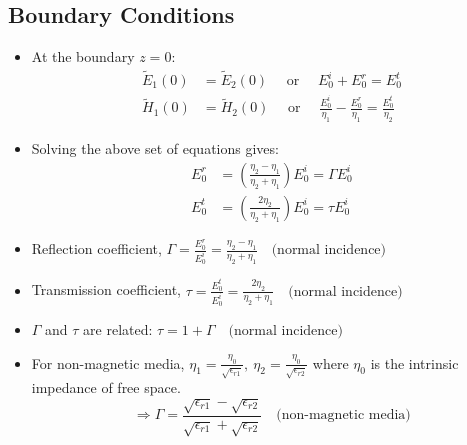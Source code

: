 \documentclass[a4paper]{article}
\begin{document}
\subsection{Boundary Conditions}
\begin{itemize}
    \item At the boundary $z = 0$:
    \begin{align*}
        \widetilde{E}_1(0) &= \widetilde{E}_2(0)\quad \text{ or }\quad E^i_0+E^r_0=E^t_0\\
        \widetilde{H}_1(0) &= \widetilde{H}_2(0)\quad \text{ or } \quad \displaystyle\frac{E^i_0}{\eta_1}-\displaystyle\frac{E^r_0}{\eta_1} = \displaystyle\frac{E^t_0}{\eta_2}
    \end{align*}
    \item Solving the above set of equations gives:
    \begin{align*}
        E^r_0 &= \left(\frac{\eta_2-\eta_1}{\eta_2+\eta_1}\right)E^i_0 = \Gamma E^i_0\\
        E^t_0 &= \left(\frac{2\eta_2}{\eta_2+\eta_1}\right)E^i_0 = \tau E^i_0
    \end{align*}
    \item Reflection coefficient, $\Gamma = \displaystyle\frac{E^r_0}{E^i_0} = \frac{\eta_2-\eta_1}{\eta_2+\eta_1}\quad\text{(normal incidence)}$
    \item Transmission coefficient, $\tau = \displaystyle\frac{E^t_0}{E^i_0} = \displaystyle\frac{2\eta_2}{\eta_2+\eta_1}\quad\text{(normal incidence)}$
    \item $\Gamma$ and $\tau$ are related: $\tau = 1+\Gamma\quad\text{(normal incidence)}$
    \item For non-magnetic media, $\eta_1 = \displaystyle\frac{\eta_0}{\sqrt{\epsilon_{r1}}},\ \eta_2 = \displaystyle\frac{\eta_0}{\sqrt{\epsilon_{r2}}}$ where $\eta_0$ is the intrinsic impedance of free space.
    $$\Rightarrow \Gamma = \frac{\sqrt{\epsilon_{r1}}-\sqrt{\epsilon_{r2}}}{\sqrt{\epsilon_{r1}}+\sqrt{\epsilon_{r2}}}\quad\text{(non-magnetic media)}$$
\end{itemize}
\end{document}
